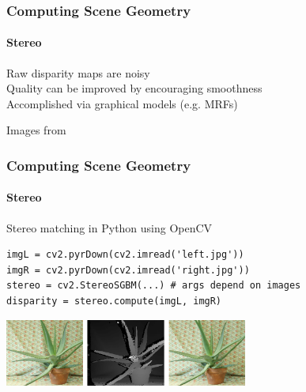 \documentclass[xetex,professionalfont]{beamer}
\newcommand{\eg}{\mbox{e.g.}\xspace} %
\begin{document}

\begin{frame}
\frametitle{Computing Scene Geometry}
\framesubtitle{Stereo}

Raw disparity maps are noisy\\\medskip
Quality can be improved by encouraging smoothness\\\medskip
Accomplished via graphical models (\eg MRFs) %

\bigskip
\begin{center}
    {\centering Images from \cite{prince12}}
\end{center}

\end{frame}


\begin{frame}[fragile]
\frametitle{Computing Scene Geometry}
\framesubtitle{Stereo}

Stereo matching in Python using OpenCV %

\medskip
\begin{verbatim}
imgL = cv2.pyrDown(cv2.imread('left.jpg'))
imgR = cv2.pyrDown(cv2.imread('right.jpg'))
stereo = cv2.StereoSGBM(...) # args depend on images
disparity = stereo.compute(imgL, imgR)
\end{verbatim}

\medskip
\begin{center}
\includegraphics[width=8cm]{figures/opencv-stereo.jpg}
\end{center}

\end{frame}
\end{document}

